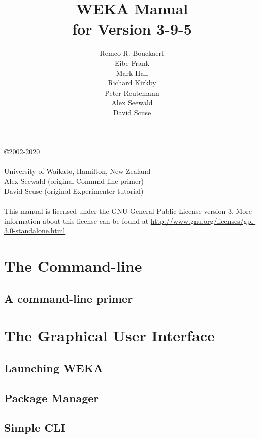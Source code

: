 \documentclass[a4paper]{book}
\title{\epsfig{file=images/coat_of_arms.eps,width=10cm}\vspace{3cm}\\WEKA Manual\\for Version 3-9-5}
\author{Remco R. Bouckaert\\Eibe Frank\\Mark Hall\\Richard Kirkby\\Peter Reutemann\\Alex Seewald\\David Scuse}
\begin{document}
\begin{titlepage}
\maketitle

\thispagestyle{empty}
\center
\begin{table}[b]
\copyright 2002-2020 \\
 \\
University of Waikato, Hamilton, New Zealand \\
Alex Seewald (original Commnd-line primer) \\
David Scuse (original Experimenter tutorial) \\
\\
This manual is licensed under the GNU General Public License version 3. More information about this license can be found at \url{http://www.gnu.org/licenses/gpl-3.0-standalone.html}
\end{table}

\end{titlepage}

\tableofcontents

\part{The Command-line}

\chapter{A command-line primer}


\part{The Graphical User Interface}

\chapter{Launching WEKA}


\chapter{Package Manager}


\chapter{Simple CLI}

\end{document}
